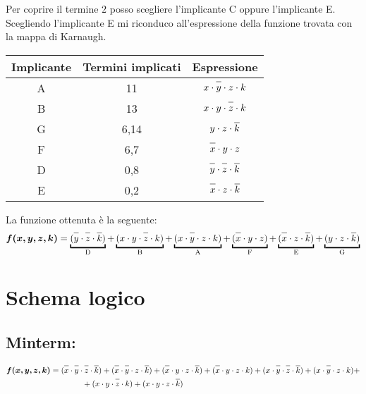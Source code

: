 \documentclass{article}
\newcommand*{\oline}[1]{\overline{#1\mathstrut}}
\newcommand{\bigspace}{\quad\quad\quad\quad}
\begin{document}
Per coprire il termine $2$ posso scegliere l'implicante C oppure l'implicante E. Scegliendo l'implicante E mi riconduco all'espressione della funzione trovata con la mappa di Karnaugh.
\begin{center}
  \begin{table}[h]
    \makegapedcells
    \centering
    {
      \begin{tabular}{|c|c|c|}
        \hline
        \textbf{Implicante} & \textbf{Termini implicati} & \textbf{Espressione} \\
        \hline
          A & 11 & $x \cdot \oline{y} \cdot z \cdot k$ \\
        \hline
          B & 13 & $x \cdot y \cdot \oline{z} \cdot k$ \\
        \hline
          G & 6,14 & $y \cdot z \cdot \oline{k}$ \\
        \hline
          F & 6,7 & $\oline{x} \cdot y \cdot z$ \\
        \hline
          D & 0,8 & $\oline{y} \cdot \oline{z} \cdot \oline{k}$ \\
        \hline
          E & 0,2 & $\oline{x} \cdot z \cdot \oline{k}$ \\
        \hline
      \end{tabular}
    }
  \end{table}
\end{center}

La funzione ottenuta è la seguente:
\begin{align*}
  \bm{f(x,y,z,k)} = \underbracket{(\oline{y} \cdot \oline{z} \cdot \oline{k})}_{\text{D}} + \underbracket{(x \cdot y \cdot \oline{z} \cdot k)}_{\text{B}} + \underbracket{(x \cdot \oline{y} \cdot z \cdot k)}_{\text{A}} + \underbracket{(\oline{x} \cdot y \cdot z)}_{\text{F}} + \underbracket{(\oline{x} \cdot z \cdot \oline{k})}_{\text{E}} + \underbracket{(y \cdot z \cdot \oline{k})}_{\text{G}}
\end{align*}

\newpage

\section{Schema logico}

\bigskip

\subsection*{Minterm:}

\begin{align*}
  \bm{f(x,y,z,k)} &= (\oline{x} \cdot \oline{y} \cdot \oline{z} \cdot \oline{k}) + (\oline{x} \cdot \oline{y} \cdot z \cdot \oline{k}) + (\oline{x} \cdot y \cdot z \cdot \oline{k}) + (\oline{x} \cdot y \cdot z \cdot k) + (x \cdot \oline{y} \cdot \oline{z} \cdot \oline{k}) + (x \cdot \oline{y} \cdot z \cdot k) + \\
  &\bigspace + (x \cdot y \cdot \oline{z} \cdot k) + (x \cdot y \cdot z \cdot \oline{k})
\end{align*}
\end{document}
